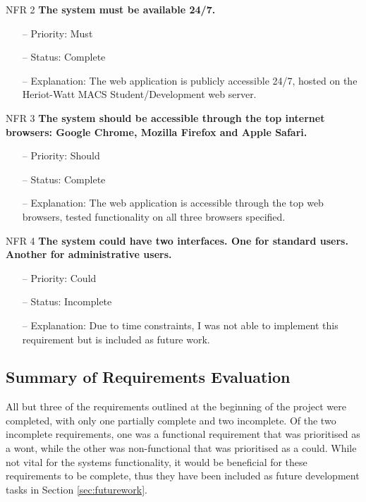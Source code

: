 \newpage
\noindent
NFR 2 \textbf{The system must be available 24/7.}
\begin{itemize}
\item[--] Priority: Must
\item[--] Status: Complete
\item[--] Explanation: The web application is publicly accessible 24/7, hosted on the Heriot-Watt MACS Student/Development web server.
\end{itemize}
\noindent
NFR 3 \textbf{The system should be accessible through the top internet browsers: Google Chrome, Mozilla Firefox and Apple Safari.}
\begin{itemize}
\item[--] Priority: Should
\item[--] Status: Complete
\item[--] Explanation: The web application is accessible through the top web browsers, tested functionality on all three browsers specified.
\end{itemize}

\noindent
NFR 4 \textbf{The system could have two interfaces. One for standard users. Another for administrative users.}
\begin{itemize}
\item[--] Priority: Could
\item[--] Status: Incomplete
\item[--] Explanation: Due to time constraints, I was not able to implement this requirement but is included as future work.
\end{itemize}

\subsection{Summary of Requirements Evaluation}
All but three of the requirements outlined at the beginning of the project were completed, with only one partially complete and two incomplete. Of the two incomplete requirements, one was a functional requirement that was prioritised as a wont, while the other was non-functional that was prioritised as a could. While not vital for the systems functionality, it would be beneficial for these requirements to be complete, thus they have been included as future development tasks in Section \ref{sec:futurework}.

